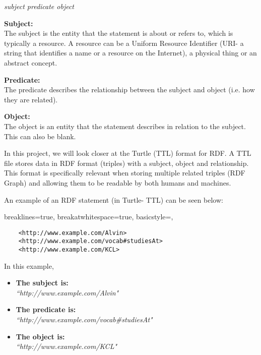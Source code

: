 \vspace{-0.1cm}
\begin{center}
\begin{beginquote}
   \textit{subject predicate object}
\end{beginquote} 
\end{center}
\vspace{-0.2cm}

\textbf{Subject:} \\
The subject is the entity that the statement is about or refers to, which is typically a resource. A resource can be a Uniform Resource Identifier (URI- a string that identifies a name or a resource on the Internet), a physical thing or an abstract concept. 

\textbf{Predicate:} \\
The predicate describes the relationship between the subject and object (i.e. how they are related). 

\textbf{Object:} \\
The object is an entity that the statement describes in relation to the subject. This can also be blank. 

In this project, we will look closer at the Turtle (TTL) format for RDF. A TTL file stores data in RDF format (triples) with a subject, object and relationship. This format is specifically relevant when storing multiple related triples (RDF Graph) and allowing them to be readable by both humans and machines. \cite{TTL}

An example of an RDF statement (in Turtle- TTL) can be seen below:

\vspace{-0.4cm}
\begin{center}
\lstset
{
    breaklines=true,
    breakatwhitespace=true,
    basicstyle=\linespread{1.5}\ttfamily,
}
\begin{lstlisting}
    <http://www.example.com/Alvin> 
    <http://www.example.com/vocab#studiesAt> 
    <http://www.example.com/KCL>
\end{lstlisting}
\end{center} 
\vspace{-0.3cm}

\noindent In this example, 
\vspace{-0.15cm}
\begin{itemize}
    \itemsep0em 
\item \textbf{The subject is:} \\ \textit{``http://www.example.com/Alvin"}
\item \textbf{The predicate is:} \\ \textit{``http://www.example.com/vocab\#studiesAt"}
\item \textbf{The object is:} \\ \textit{``http://www.example.com/KCL"}
\end{itemize}
\vspace{-0.1cm}


